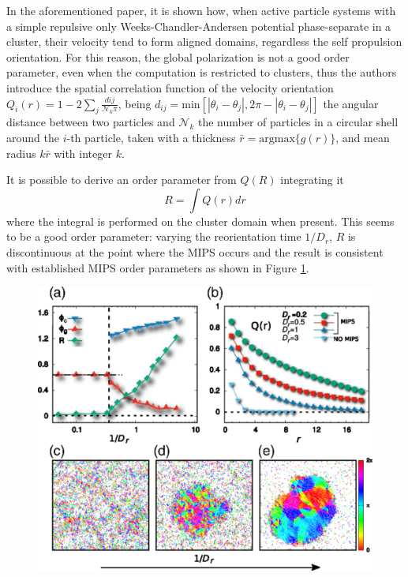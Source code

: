 \documentclass[../../master_thesis_np.tex]{subfiles}
\begin{document}
	In the aforementioned paper, it is shown how, when active particle systems with a simple repulsive only Weeks-Chandler-Andersen potential phase-separate in a cluster, their velocity tend to form aligned domains, regardless the self propulsion orientation. 
	For this reason, the global polarization is not a good order parameter, even when the computation is restricted to clusters, thus the authors introduce the spatial correlation function of the velocity orientation $Q_i(r) = 1-2\sum_{j} \frac{d{ij}}{\mathcal{N}_k \pi } $, being $d_{ij} = \mathrm{min}\left[|\theta_i - \theta_j|, 2 \pi - |\theta_i - \theta_j| \right]$ the angular distance between two particles and $\mathcal{N}_k$ the number of particles in a circular shell around the $i$-th particle, taken with a thickness $\bar{r} = \mathrm{argmax} \{g(r)\}$, and mean radius $k\bar{r}$ with integer $k$. 
	
	It is possible to derive an order parameter from $Q(R)$ integrating it
	\begin{equation} 
	R = \int Q(r) dr 
	\end{equation}
	where the integral is performed on the cluster domain when present. 
	This seems to be a good  order parameter: varying the reorientation time $1/D_r$, $R$ is discontinuous at the point where the MIPS occurs and the result is consistent with established MIPS order parameters as shown in Figure \ref{fig:caprini1}.
	
	\begin{figure}[htp]
		\centering
		\includegraphics[width=\textwidth]{caprini2.png}
		\caption{\cite{caprini_spontaneous_2020}}
		\label{fig:caprini1}
	\end{figure}
	
\end{document}
